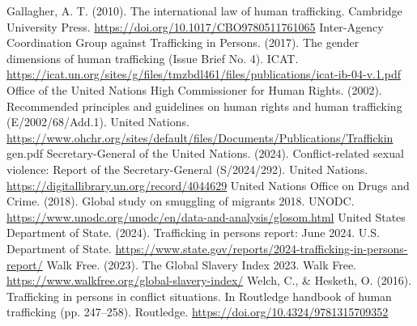 
\begin{referencelist}
   Gallagher, A. T. (2010). The international law of human trafficking. Cambridge University Press. \url{https://doi.org/10.1017/CBO9780511761065}
   Inter-Agency Coordination Group against Trafficking in Persons. (2017). The gender dimensions of human trafficking (Issue Brief No. 4). ICAT. \url{https://icat.un.org/sites/g/files/tmzbdl461/files/publications/icat-ib-04-v.1.pdf}
   Office of the United Nations High Commissioner for Human Rights. (2002). Recommended principles and guidelines on human rights and human trafficking (E/2002/68/Add.1). United Nations. \url{https://www.ohchr.org/sites/default/files/Documents/Publications/Traffickin} gen.pdf
   Secretary-General of the United Nations. (2024). Conflict-related sexual violence: Report of the Secretary-General (S/2024/292). United Nations. \url{https://digitallibrary.un.org/record/4044629}
   United Nations Office on Drugs and Crime. (2018). Global study on smuggling of migrants 2018. UNODC. \url{https://www.unodc.org/unodc/en/data-and-analysis/glosom.html}
   United States Department of State. (2024). Trafficking in persons report: June 2024. U.S. Department of State. \url{https://www.state.gov/reports/2024-trafficking-in-persons-report/}
   Walk Free. (2023). The Global Slavery Index 2023. Walk Free. \url{https://www.walkfree.org/global-slavery-index/}
   Welch, C., \& Hesketh, O. (2016). Trafficking in persons in conflict situations. In Routledge handbook of human trafficking (pp. 247–258). Routledge. \url{https://doi.org/10.4324/9781315709352}
\end{referencelist}
